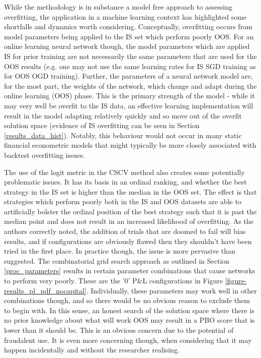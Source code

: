 \documentclass[a4paper,11pt,oneside]{article}
\theoremstyle{plain}
\theoremstyle{definition}
\begin{document}
	\texttt{}\newline
	While the methodology is in substance a model free approach to assessing overfitting, the application in a machine learning context has highlighted some shortfalls and dynamics worth considering. Conceptually, overfitting occurs from model parameters being applied to the IS set which perform poorly OOS. For an online learning neural network though, the model parameters which are applied IS for prior training are not necessarily the same parameters that are used for the OOS results (e.g. one may not use the same learning rates for IS SGD training as for OOS OGD training). Further, the parameters of a neural network model are, for the most part, the weights of the network, which change and adapt during the online learning (OOS) phase. This is the primary strength of the model - while it may very well be overfit to the IS data, an effective learning implementation will result in the model adapting relatively quickly and so move out of the overfit solution space (evidence of IS overfitting can be seen in Section \ref{results_data_hist}). Notably, this behaviour would not occur in many static financial econometric models that might typically be more closely associated with backtest overfitting issues.\newline 
	
	The use of the logit metric in the CSCV method also creates some potentially problematic issues. It has its basis in an ordinal ranking, and whether the best strategy in the IS set is higher than the median in the OOS set. The effect is that strategies which perform poorly both in the IS and OOS datasets are able to artificially bolster the ordinal position of the best strategy such that it is past the median point and does not result in an increased likelihood of overfitting. As the authors correctly noted, the addition of trials that are doomed to fail will bias results, and if configurations are obviously flawed then they shouldn't have been tried in the first place. In practice though, the issue is more pervasive than suggested. The combinatorial grid search approach as outlined in Section \ref{proc_parameters} results in certain parameter combinations that cause networks to perform very poorly. These are the '0' P\&L configurations in Figure \ref{figure-results_pl_pdf_nocapital}. Individually, these parameters may work well in other combinations though, and so there would be no obvious reason to exclude them to begin with. In this sense, an honest search of the solution space where there is no prior knowledge about what will work OOS may result in a PBO score that is lower than it should be. This is an obvious concern due to the potential of fraudalent use. It is even more concerning though, when considering that it may happen incidentally and without the researcher realising. \newline
	
\end{document}
